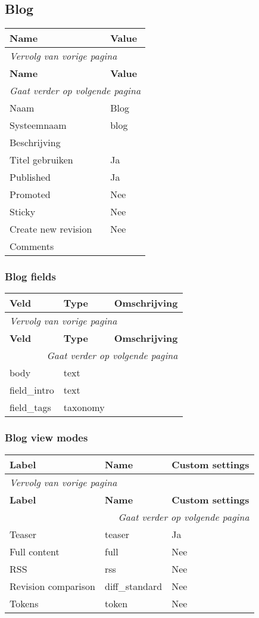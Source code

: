\subsection{Blog}
\label{sec:content-blog}
  \begin{longtable}{| p{7.50cm}|p{7.50cm}|}
  \hline
  \rowcolor{tableheader}
  \textbf{Name} & \textbf{Value}  \tabularnewline
  \hline
\endfirsthead
\multicolumn{2}{l}{\textit{Vervolg van vorige pagina}} \\
\hline
\rowcolor{tableheader}
  \textbf{Name} & \textbf{Value}  \tabularnewline
  \hline
\hline
\endhead
\multicolumn{2}{r}{\textit{Gaat verder op volgende pagina}} \\
\endfoot
\hline
\endlastfoot
  Naam & Blog  \tabularnewline
  \hline
  Systeemnaam & blog  \tabularnewline
  \hline
  Beschrijving &   \tabularnewline
  \hline
  Titel gebruiken & Ja  \tabularnewline
  \hline
  Published & Ja  \tabularnewline
  \hline
  Promoted & Nee  \tabularnewline
  \hline
  Sticky & Nee  \tabularnewline
  \hline
  Create new revision & Nee  \tabularnewline
  \hline
  Comments &   \tabularnewline
  \hline
  \end{longtable}

\subsubsection{Blog fields}
  \begin{longtable}{| p{5.00cm}|p{5.00cm}|p{5.00cm}|}
  \hline
  \rowcolor{tableheader}
  \textbf{Veld} & \textbf{Type} & \textbf{Omschrijving}  \tabularnewline
  \hline
\endfirsthead
\multicolumn{3}{l}{\textit{Vervolg van vorige pagina}} \\
\hline
\rowcolor{tableheader}
  \textbf{Veld} & \textbf{Type} & \textbf{Omschrijving}  \tabularnewline
  \hline
\hline
\endhead
\multicolumn{3}{r}{\textit{Gaat verder op volgende pagina}} \\
\endfoot
\hline
\endlastfoot
  body & text &   \tabularnewline
  \hline
  field\_intro & text &   \tabularnewline
  \hline
  field\_tags & taxonomy &   \tabularnewline
  \hline
  \end{longtable}

\subsubsection{Blog view modes}
  \begin{longtable}{| p{5.00cm}|p{5.00cm}|p{5.00cm}|}
  \hline
  \rowcolor{tableheader}
  \textbf{Label} & \textbf{Name} & \textbf{Custom settings}  \tabularnewline
  \hline
\endfirsthead
\multicolumn{3}{l}{\textit{Vervolg van vorige pagina}} \\
\hline
\rowcolor{tableheader}
  \textbf{Label} & \textbf{Name} & \textbf{Custom settings}  \tabularnewline
  \hline
\hline
\endhead
\multicolumn{3}{r}{\textit{Gaat verder op volgende pagina}} \\
\endfoot
\hline
\endlastfoot
  Teaser & teaser & Ja  \tabularnewline
  \hline
  Full content & full & Nee  \tabularnewline
  \hline
  RSS & rss & Nee  \tabularnewline
  \hline
  Revision comparison & diff\_standard & Nee  \tabularnewline
  \hline
  Tokens & token & Nee  \tabularnewline
  \hline
  \end{longtable}

